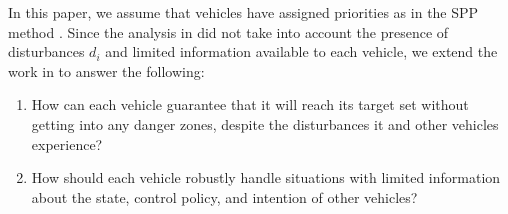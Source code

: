 In this paper, we assume that vehicles have assigned priorities as in the SPP method \cite{Chen15}. Since the analysis in \cite{Chen15} did not take into account the presence of disturbances $d_i$ and limited information available to each vehicle, we extend the work in \cite{Chen15} to answer the following:
\begin{enumerate}
\item How can each vehicle guarantee that it will reach its target set without getting into any danger zones, despite the disturbances it and other vehicles experience?
\item How should each vehicle robustly handle situations with limited information about the state, control policy, and intention of other vehicles?
\end{enumerate}
%
